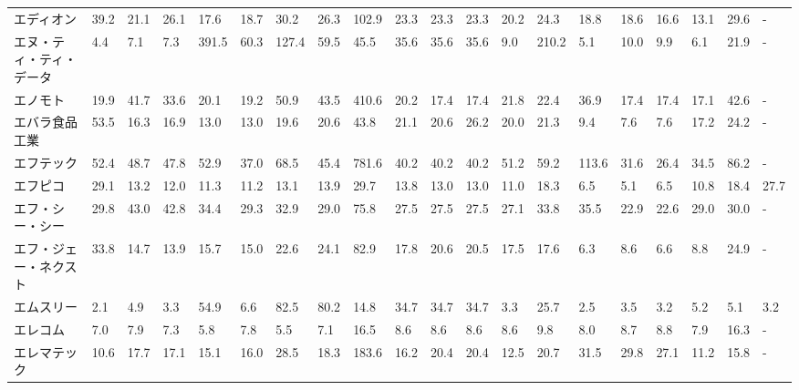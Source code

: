 \begin{tabular}{llllllllllllllllllll}
エディオン           &   39.2 &   21.1 &      26.1 &      17.6 &       18.7 &    30.2 &    26.3 &    102.9 &    23.3 &    23.3 &   23.3 &   20.2 &    24.3 &    18.8 &    18.6 &   16.6 &   13.1 &    29.6 &      - \\
エヌ・ティ・ティ・データ    &    4.4 &    7.1 &       7.3 &     391.5 &       60.3 &   127.4 &    59.5 &     45.5 &    35.6 &    35.6 &   35.6 &    9.0 &   210.2 &     5.1 &    10.0 &    9.9 &    6.1 &    21.9 &      - \\
エノモト            &   19.9 &   41.7 &      33.6 &      20.1 &       19.2 &    50.9 &    43.5 &    410.6 &    20.2 &    17.4 &   17.4 &   21.8 &    22.4 &    36.9 &    17.4 &   17.4 &   17.1 &    42.6 &      - \\
エバラ食品工業         &   53.5 &   16.3 &      16.9 &      13.0 &       13.0 &    19.6 &    20.6 &     43.8 &    21.1 &    20.6 &   26.2 &   20.0 &    21.3 &     9.4 &     7.6 &    7.6 &   17.2 &    24.2 &      - \\
エフテック           &   52.4 &   48.7 &      47.8 &      52.9 &       37.0 &    68.5 &    45.4 &    781.6 &    40.2 &    40.2 &   40.2 &   51.2 &    59.2 &   113.6 &    31.6 &   26.4 &   34.5 &    86.2 &      - \\
エフピコ            &   29.1 &   13.2 &      12.0 &      11.3 &       11.2 &    13.1 &    13.9 &     29.7 &    13.8 &    13.0 &   13.0 &   11.0 &    18.3 &     6.5 &     5.1 &    6.5 &   10.8 &    18.4 &   27.7 \\
エフ・シー・シー        &   29.8 &   43.0 &      42.8 &      34.4 &       29.3 &    32.9 &    29.0 &     75.8 &    27.5 &    27.5 &   27.5 &   27.1 &    33.8 &    35.5 &    22.9 &   22.6 &   29.0 &    30.0 &      - \\
エフ・ジェー・ネクスト     &   33.8 &   14.7 &      13.9 &      15.7 &       15.0 &    22.6 &    24.1 &     82.9 &    17.8 &    20.6 &   20.5 &   17.5 &    17.6 &     6.3 &     8.6 &    6.6 &    8.8 &    24.9 &      - \\
エムスリー           &    2.1 &    4.9 &       3.3 &      54.9 &        6.6 &    82.5 &    80.2 &     14.8 &    34.7 &    34.7 &   34.7 &    3.3 &    25.7 &     2.5 &     3.5 &    3.2 &    5.2 &     5.1 &    3.2 \\
エレコム            &    7.0 &    7.9 &       7.3 &       5.8 &        7.8 &     5.5 &     7.1 &     16.5 &     8.6 &     8.6 &    8.6 &    8.6 &     9.8 &     8.0 &     8.7 &    8.8 &    7.9 &    16.3 &      - \\
エレマテック          &   10.6 &   17.7 &      17.1 &      15.1 &       16.0 &    28.5 &    18.3 &    183.6 &    16.2 &    20.4 &   20.4 &   12.5 &    20.7 &    31.5 &    29.8 &   27.1 &   11.2 &    15.8 &      - \\

\end{tabular}
